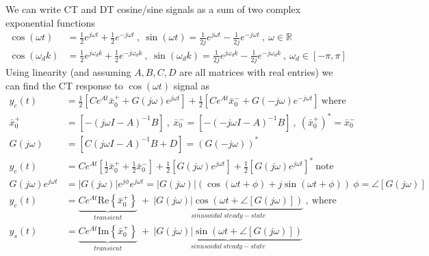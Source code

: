 \documentclass[twoside]{article}
\begin{document}
We can write CT and DT cosine/sine signals as a sum of two complex exponential functions
%
\begin{align*} 
    \cos(\omega t) &= \frac{1}{2} e^{j \omega t} + \frac{1}{2} e^{-j \omega t} \ , \ \sin(\omega t) = \frac{1}{2 j} e^{j \omega t} - \frac{1}{2 j} e^{-j \omega t} \ , \ \omega \in \mathbb{R} 
    \\[1ex]
    \cos(\omega_d k) &= \frac{1}{2} e^{j \omega_d k} + \frac{1}{2} e^{-j \omega_d k} \ , \  \sin(\omega_d k) = \frac{1}{2 j} e^{j \omega_d k} - \frac{1}{2 j} e^{-j \omega_d k} \ , \ \omega_d \in \left[ -\pi , \pi \right] 
\end{align*}
%
Using linearity (and assuming $A, B, C, D$ are all matrices with real entries) we can find the CT response to $\cos(\omega t)$ signal as
%
\begin{align*}
   y_c(t) &= \frac{1}{2} \left[ C e^{A t} \bar{x}_0^+ + G(j \omega) e^{j \omega t} \right] + \frac{1}{2} \left[ C e^{A t} \bar{x}_0^- + G(-j \omega) e^{-j \omega t} \right] \ \mathrm{where} \ 
   \\[1ex]
   \bar{x}_0^+ &= \left[ - (j \omega I - A)^{-1} B \right]  \ , \ \bar{x}_0^- = \left[ - (-j \omega I - A)^{-1} B \right] \ , \ \left( \bar{x}_0^+ \right)^* = \bar{x}_0^- 
   \\[1ex]
   G(j \omega) &= \left[ C (j \omega I - A)^{-1} B + D \right] = \left( G(-j \omega) \right)^*
   \\[1ex]
   y_c(t) &= C e^{A t} \left[ \frac{1}{2} \bar{x}_0^+ + \frac{1}{2} \bar{x}_0^- \right] +
   \frac{1}{2} \left[ G(j \omega) e^{j \omega t} \right] + \frac{1}{2} \left[ G(j \omega) e^{j \omega t} \right]^* \ \mathrm{note} 
   \\[1ex]
   G(j \omega) e^{j \omega t} &= |G(j \omega)| e^{j \phi} e^{j \omega t} = |G(j \omega)| \left( \cos (\omega t + \phi) + j \sin (\omega t + \phi) \right) \ \phi = \angle [G(j \omega)]
   \\[1ex]
   y_c(t) &=  \underbrace{C e^{A t} \mathrm{Re}\left\lbrace \bar{x}_0^+ \right\rbrace}_{transient}  \ +  \  \underbrace{| G(j \omega) | \cos \left( \omega t + \angle [G(j \omega)] \right)}_{sinusoidal \ steady-state} \ , \ \mathrm{where}
   \\[1ex]
   y_s(t) &=  \underbrace{C e^{A t} \mathrm{Im}\left\lbrace \bar{x}_0^+ \right\rbrace}_{transient}  \ +  \  \underbrace{| G(j \omega) | \sin \left( \omega t + \angle [G(j \omega)] \right)}_{sinusoidal \ steady-state}
\end{align*}
\end{document}
